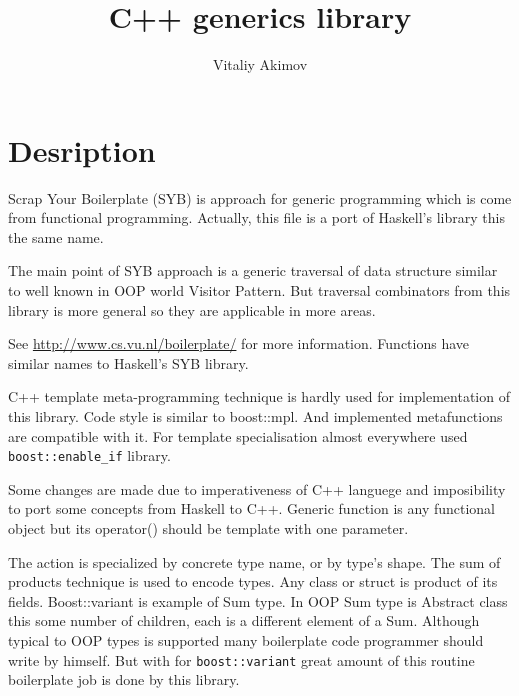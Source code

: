 \documentclass[a4paper]{article}
\begin{document}
\author{Vitaliy Akimov}

\title{C++ generics library}

\newcommand{\gfun}[1]{\subsection{#1}}
\newcommand{\gfunname}[1]{\gfun{#1 function}}

\maketitle
\newpage

\tableofcontents
\newpage

\section{Desription}

Scrap Your Boilerplate (SYB) is approach for generic programming which is come from functional programming.
Actually, this file is a port of Haskell's library this the same name.

The main point of SYB approach is a generic traversal of data structure similar to well known in OOP world Visitor Pattern.
But traversal combinators from this library is more general so they are applicable in more areas.

See \url{http://www.cs.vu.nl/boilerplate/} for more information. Functions have similar names to Haskell's SYB library.

C++ template meta-programming technique is hardly used for implementation of this library.
Code style is similar to boost::mpl. And implemented metafunctions are compatible with it.
For template specialisation almost everywhere used \lstinline$boost::enable_if$ library.

Some changes are made due to imperativeness of C++ languege and imposibility to port some concepts from Haskell to C++.
Generic function is any functional object but its operator() should be template with one parameter.

The action is specialized by concrete type name, or by type's shape. The sum of products technique is used to encode types.
Any class or struct is product of its fields. Boost::variant is example of Sum type.
In OOP Sum type is Abstract class this some number of children, each is a different element of a Sum.
Although typical to OOP types is supported many boilerplate code programmer should write by himself.
But with for \lstinline$boost::variant$ great amount of this routine boilerplate job is done by this library.
\end{document}
